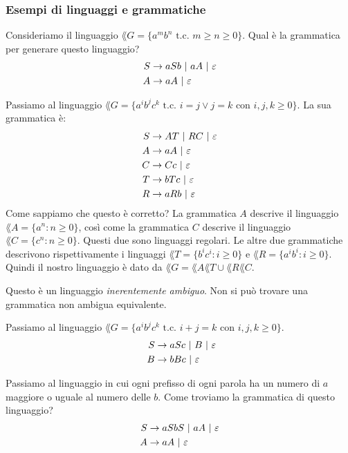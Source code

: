 \subsubsection{Esempi di linguaggi e grammatiche}

Consideriamo il linguaggio $\lang{G} = \{ a^m b^n \text{ t.c. } m \ge n \ge 0 \}$.
Qual \`e la grammatica per generare questo linguaggio?
\begin{align*}
	S &\to aSb \ | \  aA \ | \  \varepsilon \\
	A &\to aA \ | \  \varepsilon
\end{align*}

Passiamo al linguaggio $\lang{G} = \{ a^i b^j c^k \text{ t.c. } i = j \lor j = k \text{ con } i,j,k \ge 0 \}$.
La sua grammatica \`e:
\begin{align*}
	S &\to AT \ | \  RC \ | \  \varepsilon \\
	A &\to aA \ | \  \varepsilon \\
	C &\to Cc \ | \  \varepsilon \\
	T &\to bTc \ | \  \varepsilon \\
	R &\to aRb \ | \  \varepsilon
\end{align*}
Come sappiamo che questo \`e corretto?
La grammatica $A$ descrive il linguaggio $\lang{A} = \{ a^n : n \ge 0 \}$, cos\`i come la grammatica $C$ descrive il linguaggio $\lang{C} = \{c^n : n \ge 0\}$.
Questi due sono linguaggi regolari.
Le altre due grammatiche descrivono rispettivamente i linguaggi $\lang{T} = \{ b^i c^i : i \ge 0 \}$ e $\lang{R} = \{ a^i b^i : i \ge 0 \}$.
Quindi il nostro linguaggio \`e dato da $\lang{G} = \lang{A}\lang{T} \cup \lang{R}\lang{C}$.

Questo \`e un linguaggio \emph{inerentemente ambiguo}.
Non si pu\`o trovare una grammatica non ambigua equivalente.

Passiamo al linguaggio $\lang{G} = \{ a^i b^j c^k \text{ t.c. } i + j = k \text{ con } i,j,k \ge 0 \}$.
\begin{align*}
	S &\to aSc \ | \  B \ | \  \varepsilon \\\
	B &\to bBc \ | \  \varepsilon
\end{align*}

Passiamo al linguaggio in cui ogni prefisso di ogni parola ha un numero di $a$ maggiore o uguale al numero delle $b$.
Come troviamo la grammatica di questo linguaggio?
\begin{align*}
	S &\to aSbS \ | \  aA \ | \  \varepsilon \\
	A &\to aA \ | \  \varepsilon
\end{align*}

